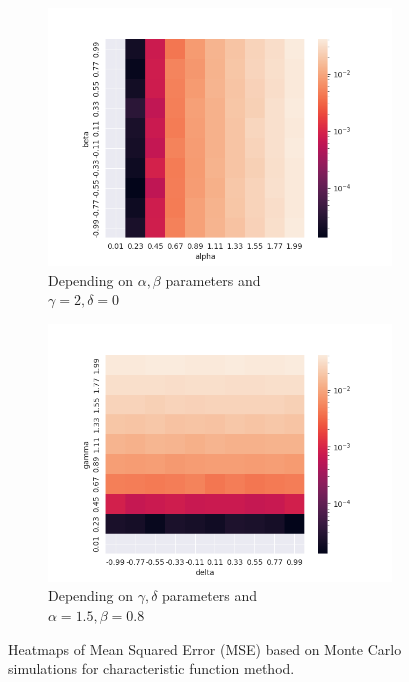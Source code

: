 \documentclass{article}
\begin{document}
		\begin{figure}[H]
			\begin{subfigure}{.5\textwidth}
				\centering
				\includegraphics[width=1\linewidth]{images/heatmap_cf_MSE_alpha_beta.png}
				\caption{Depending on $\alpha, \beta$ parameters and \\$\gamma = 2, \delta = 0$}
			\end{subfigure}
			\begin{subfigure}[r]{.5\textwidth}
				\centering
				\includegraphics[width=1\linewidth]{images/heatmap_cf_MSE_gamma_delta.png}
				\caption{{Depending on $\gamma, \delta$ parameters and \\$\alpha = 1.5, \beta = 0.8$}}
			\end{subfigure}
			\caption{Heatmaps of Mean Squared Error (MSE) based on Monte Carlo simulations for characteristic function method.}\label{heat3}
		\end{figure}
\end{document}
